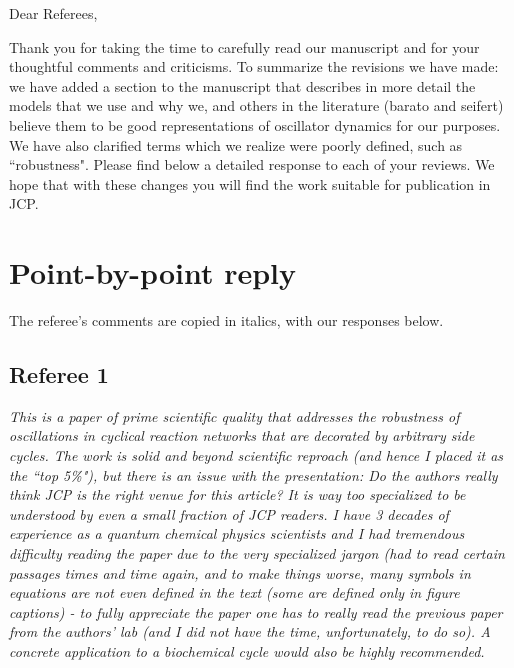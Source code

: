 \documentclass[amsmath, preprintnumbers, 12pt, onecolumn, pre, longbibliograpy]{revtex4-1}
\begin{document}
\thispagestyle{empty}
\noindent Dear Referees,

\vspace{1cm}

Thank you for taking the time to carefully read our manuscript and for your thoughtful comments and criticisms. To summarize the revisions we have made: we have added a section to the manuscript that describes in more detail the models that we use and why we, and others in the literature (barato and seifert) believe them to be good representations of oscillator dynamics for our purposes. We have also clarified terms which we realize were poorly defined, such as ``robustness". Please find below a detailed response to each of your reviews. We hope that with these changes you will find the work suitable for publication in JCP.


\section*{Point-by-point reply}

The referee's comments are copied in italics, with our responses below.

\subsection*{Referee 1}

\textit{This is a paper of prime scientific quality that addresses the robustness of oscillations in cyclical reaction networks that are decorated by arbitrary side cycles. The work is solid and beyond scientific reproach (and hence I placed it as the ``top 5\%"), but there is an issue with the presentation: Do the authors really think JCP is the right venue for this article? It is way too specialized to be understood by even a small fraction of JCP readers. I have 3 decades of experience as a quantum chemical physics scientists and I had tremendous difficulty reading the paper due to the very specialized jargon (had to read certain passages times and time again, and to make things worse, many symbols in equations are not even defined in the text (some are defined only in figure captions) - to fully appreciate the paper one has to really read the previous paper from the authors' lab (and I did not have the time, unfortunately, to do so). A concrete application to a biochemical cycle would also be highly recommended.}

\end{document}
